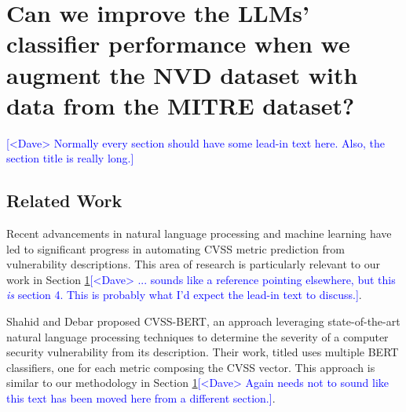 \documentclass[12pt]{article}
\newcommand{\note}[2][red]{\textcolor{#1}{#2}}
\newcommand{\notedme}[1]{\note[blue]{[<Dave> #1]}}
\begin{document}


\section{Can we improve the LLMs' classifier performance when we augment the NVD dataset with data
  from the MITRE dataset?}\label{cvss_prediction}

\notedme{Normally every section should have some lead-in text here. Also, the section title is really long.}

\subsection{Related Work}

Recent advancements in natural language processing and machine learning have led to significant
progress in automating CVSS metric prediction from vulnerability descriptions. This area of research
is particularly relevant to our work in Section \ref{cvss_prediction}\notedme{... sounds like a reference pointing elsewhere, but this \emph{is} section 4. This is probably what I'd expect the lead-in text to discuss.}.

Shahid and Debar \cite{cvss_bert} proposed CVSS-BERT, an approach leveraging state-of-the-art
natural language processing techniques to determine the severity of a computer security
vulnerability from its description. Their work, titled 
uses multiple BERT classifiers, one for each metric composing the CVSS vector. This approach is
similar to our methodology in Section \ref{cvss_prediction}\notedme{Again needs not to sound like this text has been moved here from a different section.}.
\end{document}
